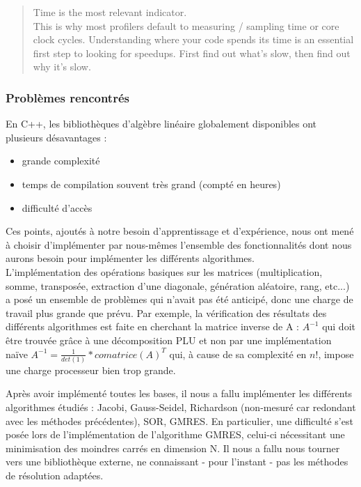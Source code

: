 \begin{quote}
	Time is the most relevant indicator.\\
	This is why most profilers default to measuring / sampling time or core clock cycles. Understanding where your code spends its time is an essential first step to looking for speedups. First find out what's slow, then find out why it's slow.
\end{quote}


\subsubsection{Problèmes rencontrés}
En C++, les bibliothèques d'algèbre linéaire globalement disponibles ont plusieurs désavantages :
\begin{itemize}
	\item grande complexité
	\item temps de compilation souvent très grand (compté en heures)
	\item difficulté d'accès
\end{itemize}

Ces points, ajoutés à notre besoin d'apprentissage et d'expérience, nous ont mené à choisir d'implémenter par nous-mêmes l'ensemble des fonctionnalités dont nous aurons besoin pour implémenter les différents algorithmes.\\

L'implémentation des opérations basiques sur les matrices (multiplication, somme, transposée, extraction d'une diagonale, génération aléatoire, rang, etc...) a posé un ensemble de problèmes qui n'avait pas été anticipé, donc une charge de travail plus grande que prévu. Par exemple, la vérification des résultats des différents algorithmes est faite en cherchant la matrice inverse de A : $A^{-1}$ qui doit être trouvée grâce à une décomposition PLU et non par une implémentation naïve $A^{-1} = \frac{1}{det(1)} * comatrice(A)^{T}$ qui, à cause de sa complexité en $n!$, impose une charge processeur bien trop grande.

Après avoir implémenté toutes les bases, il nous a fallu implémenter les différents algorithmes étudiés : Jacobi, Gauss-Seidel, Richardson (non-mesuré car redondant avec les méthodes précédentes), SOR, GMRES. En particulier, une difficulté s'est posée lors de l'implémentation de l'algorithme GMRES, celui-ci nécessitant une minimisation des moindres carrés en dimension N. Il nous a fallu nous tourner vers une bibliothèque externe, ne connaissant - pour l'instant - pas les méthodes de résolution adaptées.

